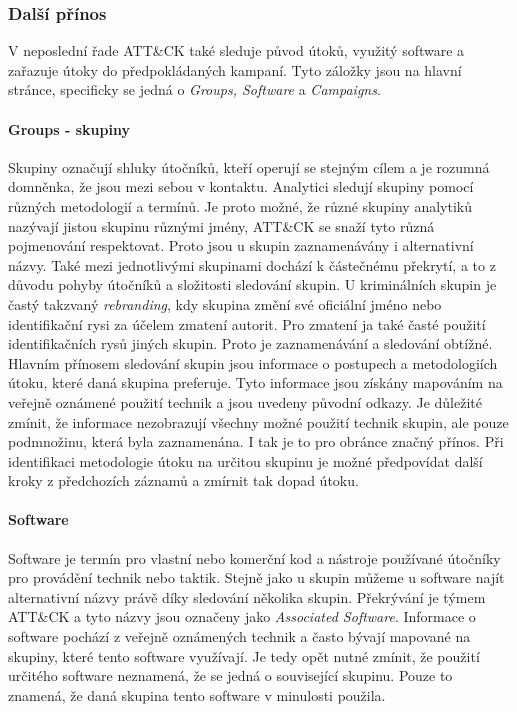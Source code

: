 \subsubsection{Další přínos}
V neposlední řade ATT\&CK také sleduje původ útoků, využitý software a zařazuje útoky do předpokládaných kampaní.
Tyto záložky jsou na hlavní stránce, specificky se jedná o \textit{Groups, Software} a \textit{Campaigns}.

\paragraph{Groups - skupiny}
Skupiny označují shluky útočníků, kteří operují se stejným cílem a je rozumná domněnka, že jsou mezi sebou v kontaktu.
Analytici sledují skupiny pomocí různých  metodologií a termínů.
Je proto možné, že různé skupiny analytiků nazývají jistou skupinu různými jmény, ATT\&CK se snaží tyto různá pojmenování respektovat.
Proto jsou u skupin zaznamenávány i alternativní názvy.
Také mezi jednotlivými skupinami dochází k částečnému překrytí, a to z důvodu pohyby útočníků a složitosti sledování skupin.
U kriminálních skupin je častý takzvaný \textit{rebranding}, kdy skupina změní své oficiální jméno nebo identifikační rysi za účelem zmatení autorit.
Pro zmatení ja také časté použití identifikačních rysů jiných skupin.
Proto je zaznamenávání a sledování obtížné.
Hlavním přínosem sledování skupin jsou informace o postupech a metodologiích útoku, které daná skupina preferuje.
Tyto informace jsou získány mapováním na veřejně oznámené použití technik a jsou uvedeny původní odkazy.
Je důležité zmínit, že informace nezobrazují všechny možné použití technik skupin, ale pouze podmnožinu, která byla zaznamenána.
I tak je to pro obránce značný přínos.
Při identifikaci metodologie útoku na určitou skupinu je možné předpovídat další kroky z předchozích záznamů a zmírnit tak dopad útoku.\cite{Mitre_groups}


\paragraph{Software}
Software je termín pro vlastní nebo komerční kod a nástroje používané útočníky pro provádění technik nebo taktik.
Stejně jako u skupin můžeme u software najít alternativní názvy právě díky sledování několika skupin.
Překrývání je týmem ATT\&CK a tyto názvy jsou označeny jako \textit{Associated Software}.
Informace o software pochází z veřejně oznámených technik a často bývají mapované na skupiny, které tento software využívají.
Je tedy opět nutné zmínit, že použití určitého software neznamená, že se jedná o související skupinu.
Pouze to znamená, že daná skupina tento software v minulosti použila.\cite{Mitre_software}


